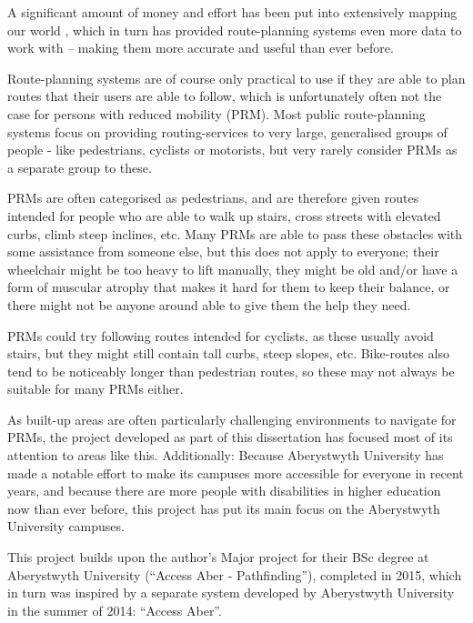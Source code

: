 A significant amount of money and effort has been put into extensively mapping our world \cite{OSM,gmaps1,gmaps2,geofabrik}, which in turn has provided route-planning systems even more data to work with -- making them more accurate and useful than ever before.

Route-planning systems are of course only practical to use if they are able to plan routes that their users are able to follow, which is unfortunately often not the case for persons with reduced mobility (PRM). Most public route-planning systems focus on providing routing-services to very large, generalised groups of people - like pedestrians, cyclists or motorists, but very rarely consider PRMs as a separate group to these.

PRMs are often categorised as pedestrians, and are therefore given routes intended for people who are able to walk up stairs, cross streets with elevated curbs, climb steep inclines, etc. Many PRMs are able to pass these obstacles with some assistance from someone else, but this does not apply to everyone; their wheelchair might be too heavy to lift manually, they might be old and/or have a form of muscular atrophy that makes it hard for them to keep their balance, or there might not be anyone around able to give them the help they need.

PRMs could try following routes intended for cyclists, as these usually avoid stairs, but they might still contain tall curbs, steep slopes, etc. Bike-routes also tend to be noticeably longer than pedestrian routes, so these may not always be suitable for many PRMs either.

As built-up areas are often particularly challenging environments to navigate for PRMs, the project developed as part of this dissertation has focused most of its attention to areas like this. Additionally: Because Aberystwyth University has made a notable effort to make its campuses more accessible for everyone in recent years, and because there are more people with disabilities in higher education now than ever before\cite{tinklin2004}, this project has put its main focus on the Aberystwyth University campuses.

This project builds upon the author's Major project for their BSc degree at Aberystwyth University (\textquotedblleft Access Aber - Pathfinding\textquotedblright), completed in 2015, which in turn was inspired by a separate system developed by Aberystwyth University in the summer of 2014: \textquotedblleft Access Aber\textquotedblright.

